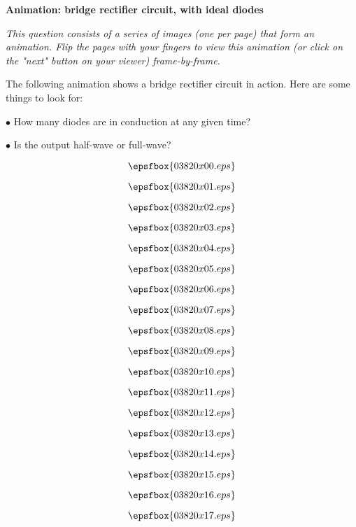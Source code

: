 

\centerline{\bf Animation: bridge rectifier circuit, with ideal diodes}

\vskip 10pt

{\it This question consists of a series of images (one per page) that form an animation.  Flip the pages with your fingers to view this animation (or click on the "next" button on your viewer) frame-by-frame.}

\vskip 10pt

The following animation shows a bridge rectifier circuit in action.  Here are some things to look for:

\medskip
\goodbreak
\item{$\bullet$} How many diodes are in conduction at any given time?
\item{$\bullet$} Is the output half-wave or full-wave?
\medskip

\vfil \eject
$$\epsfbox{03820x00.eps}$$

\vfil \eject
$$\epsfbox{03820x01.eps}$$

\vfil \eject
$$\epsfbox{03820x02.eps}$$

\vfil \eject
$$\epsfbox{03820x03.eps}$$

\vfil \eject
$$\epsfbox{03820x04.eps}$$

\vfil \eject
$$\epsfbox{03820x05.eps}$$

\vfil \eject
$$\epsfbox{03820x06.eps}$$

\vfil \eject
$$\epsfbox{03820x07.eps}$$

\vfil \eject
$$\epsfbox{03820x08.eps}$$

\vfil \eject
$$\epsfbox{03820x09.eps}$$

\vfil \eject
$$\epsfbox{03820x10.eps}$$

\vfil \eject
$$\epsfbox{03820x11.eps}$$

\vfil \eject
$$\epsfbox{03820x12.eps}$$

\vfil \eject
$$\epsfbox{03820x13.eps}$$

\vfil \eject
$$\epsfbox{03820x14.eps}$$

\vfil \eject
$$\epsfbox{03820x15.eps}$$

\vfil \eject
$$\epsfbox{03820x16.eps}$$

\vfil \eject
$$\epsfbox{03820x17.eps}$$

